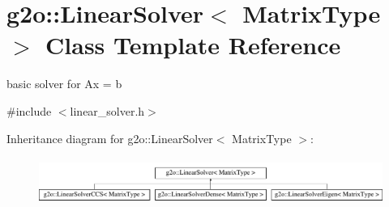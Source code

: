 \hypertarget{classg2o_1_1_linear_solver}{}\section{g2o\+:\+:Linear\+Solver$<$ Matrix\+Type $>$ Class Template Reference}
\label{classg2o_1_1_linear_solver}


basic solver for Ax = b  




{\ttfamily \#include $<$linear\+\_\+solver.\+h$>$}

Inheritance diagram for g2o\+:\+:Linear\+Solver$<$ Matrix\+Type $>$\+:\begin{figure}[H]
\begin{center}
\leavevmode
\includegraphics[height=1.536351cm]{classg2o_1_1_linear_solver}
\end{center}
\end{figure}
